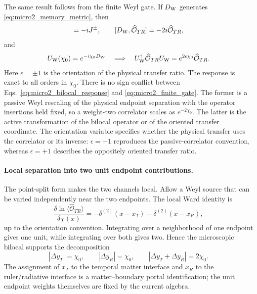 \documentclass[aps,prd,twocolumn,10pt,superscriptaddress,nofootinbib]{revtex4-2}
\begin{document}
The same result follows from the finite Weyl gate.  If $D_{\rm W}$ generates
\eqref{eq:micro2_memory_metric}, then
\begin{equation}
 [D_{\rm W},J^\pm]=-iJ^\pm,
 \qquad
 [D_{\rm W},\widehat{\mathcal O}_{TR}]
 =-2i\widehat{\mathcal O}_{TR},
\end{equation}
and
\begin{equation}
 U_{\rm W}(\chi_0)=e^{-i\chi_0D_{\rm W}}
 \quad\Longrightarrow\quad
 U_{\rm W}^{\dagger}\widehat{\mathcal O}_{TR}U_{\rm W}
 =e^{2\epsilon\chi_0}\widehat{\mathcal O}_{TR}.
\label{eq:micro2_finite_gate}
\end{equation}
Here $\epsilon=\pm1$ is the orientation of the physical transfer ratio.
The response is exact to all orders in $\chi_0$.  There is no sign conflict
between Eqs.~\eqref{eq:micro2_bilocal_response} and
\eqref{eq:micro2_finite_gate}.  The former is a passive Weyl rescaling of
the physical endpoint separation with the operator insertions held fixed,
so a weight-two correlator scales as $e^{-2\chi_0}$.  The latter is the
active transformation of the bilocal operator or of the oriented transfer
coordinate.  The orientation variable specifies whether the physical
transfer uses the correlator or its inverse: $\epsilon=-1$ reproduces the
passive-correlator convention, whereas $\epsilon=+1$ describes the
oppositely oriented transfer ratio.

\paragraph{Local separation into two unit endpoint contributions.}
The point-split form makes the two channels local.  Allow a Weyl source that
can be varied independently near the two endpoints.  The local Ward identity
is
\begin{equation}
 \frac{\delta\ln\langle\widehat{\mathcal O}_{TR}\rangle}
      {\delta\chi(x)}
 =-\delta^{(2)}(x-x_T)-\delta^{(2)}(x-x_R),
\label{eq:micro2_local_ward}
\end{equation}
up to the orientation convention.  Integrating over a neighborhood of one
endpoint gives one unit, while integrating over both gives two.  Hence the
microscopic bilocal supports the decomposition
\begin{equation}
 |\Delta y_T|=\chi_0,
 \qquad
 |\Delta y_R|=\chi_0,
 \qquad
 |\Delta y_T+\Delta y_R|=2\chi_0.
\label{eq:micro2_unit_endpoint_shifts}
\end{equation}
The assignment of $x_T$ to the temporal matter interface and $x_R$ to the
ruler/radiative interface is a matter--boundary portal identification; the
unit endpoint weights themselves are fixed by the current algebra.
\end{document}
